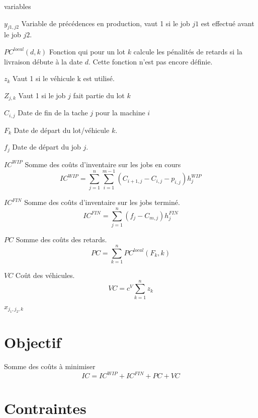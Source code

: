 \documentclass{article}
\begin{document}
        \begin{labeling}{variables}
            \item [$y_{j1,j2}$] Variable de précédences en production, vaut 1 si le job $j1$ est effectué avant le job $j2$. 
            \item [$PC^{local}\left(d,k\right)$] Fonction qui pour un lot $k$ calcule les pénalités de retards si la livraison débute à la date $d$. Cette fonction n’est pas encore définie.
            \item [$z_k$] Vaut 1 si le véhicule k est utilisé.
            \item [$Z_{j,k}$] Vaut 1 si le job $j$ fait partie du lot $k$
            \item [$C_{i,j}$] Date de fin de la tache $j$ pour la machine $i$
            \item [$F_k$] Date de départ du lot/véhicule $k$.
            \item [$f_j$] Date de départ du job $j$.
            \item [$IC^{WIP}$] Somme des coûts d’inventaire sur les jobs en cours
            $$IC^{WIP}=\sum_{j=1}^{n}\sum_{i=1}^{m-1}{\left(C_{i+1,j}-C_{i,j}-p_{i,j}\right)h_j^{WIP}}$$
            
            \item [$IC^{FIN}$] Somme des coûts d’inventaire sur les jobs terminé.
            $${IC}^{FIN}=\sum_{j=1}^{n}{\left(f_j-C_{m,j}\right)h_j^{FIN}}$$
            \item [$PC$] Somme des coûts des retards.
            $$PC=\sum_{k=1}^{n}{PC^{local}\left(F_k, k\right)}$$
            \item[$VC$] Coût des véhicules.
            $$VC=c^V\sum_{k=1}^{n}z_k$$
            
            \item
                [$x_{j_1,j_2,k}$]
                
            
        \end{labeling}
    
    
    \section*{Objectif}
        Somme des coûts à minimiser 
        $$IC=IC^{WIP}+IC^{FIN}+PC+VC$$
        
    
    \section*{Contraintes}
    
\end{document}
